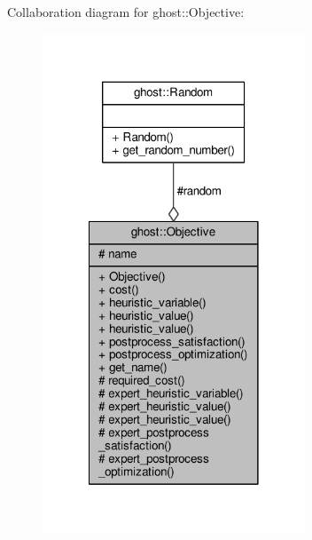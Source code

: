 Collaboration diagram for ghost\-:\-:Objective\-:\nopagebreak
\begin{figure}[H]
\begin{center}
\leavevmode
\includegraphics[width=222pt]{classghost_1_1Objective__coll__graph}
\end{center}
\end{figure}
